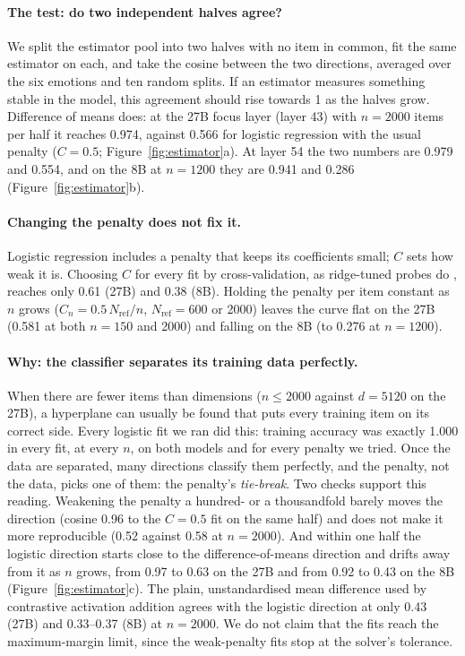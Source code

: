 \documentclass{article}
\begin{document}
\paragraph{The test: do two independent halves agree?} We split the estimator pool into two halves with no item in common, fit the same estimator on each, and take the cosine between the two directions, averaged over the six emotions and ten random splits. If an estimator measures something stable in the model, this agreement should rise towards 1 as the halves grow. Difference of means does: at the 27B focus layer (layer 43) with $n = 2000$ items per half it reaches 0.974, against 0.566 for logistic regression with the usual penalty ($C = 0.5$; Figure~\ref{fig:estimator}a). At layer 54 the two numbers are 0.979 and 0.554, and on the 8B at $n = 1200$ they are 0.941 and 0.286 (Figure~\ref{fig:estimator}b).

\paragraph{Changing the penalty does not fix it.} Logistic regression includes a penalty that keeps its coefficients small; $C$ sets how weak it is. Choosing $C$ for every fit by cross-validation, as ridge-tuned probes do \citep{gao2026raptor}, reaches only 0.61 (27B) and 0.38 (8B). Holding the penalty per item constant as $n$ grows ($C_n = 0.5\,N_{\mathrm{ref}}/n$, $N_{\mathrm{ref}} = 600$ or 2000) leaves the curve flat on the 27B (0.581 at both $n = 150$ and 2000) and falling on the 8B (to 0.276 at $n = 1200$).

\paragraph{Why: the classifier separates its training data perfectly.} When there are fewer items than dimensions ($n \le 2000$ against $d = 5120$ on the 27B), a hyperplane can usually be found that puts every training item on its correct side. Every logistic fit we ran did this: training accuracy was exactly 1.000 in every fit, at every $n$, on both models and for every penalty we tried. Once the data are separated, many directions classify them perfectly, and the penalty, not the data, picks one of them: the penalty's \emph{tie-break}. Two checks support this reading. Weakening the penalty a hundred- or a thousandfold barely moves the direction (cosine 0.96 to the $C = 0.5$ fit on the same half) and does not make it more reproducible (0.52 against 0.58 at $n = 2000$). And within one half the logistic direction starts close to the difference-of-means direction and drifts away from it as $n$ grows, from 0.97 to 0.63 on the 27B and from 0.92 to 0.43 on the 8B (Figure~\ref{fig:estimator}c). The plain, unstandardised mean difference used by contrastive activation addition \citep{rimsky2023caa} agrees with the logistic direction at only 0.43 (27B) and 0.33--0.37 (8B) at $n = 2000$. We do not claim that the fits reach the maximum-margin limit, since the weak-penalty fits stop at the solver's tolerance.
\end{document}
